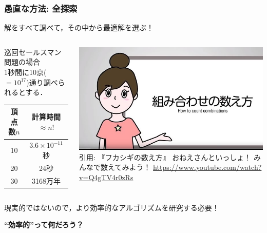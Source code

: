 \documentclass[14pt,aspectratio=169,xcolor=dvipsnames,table,onlytextwidth,dvipdfmx]{beamer}
\begin{document}
\begin{frame}
    \frametitle{愚直な方法: 全探索}
    解をすべて調べて，その中から最適解を選ぶ！
    \pause
    \begin{center}
        \begin{columns}[T]
        \begin{column}{.5\textwidth}
        \centering
        巡回セールスマン問題の場合 \\
        {\scriptsize 1秒間に10京($=10^{17}$)通り調べられるとする．}

        \bigskip
        \begin{tabular}{cc}
            頂点数$n$ & 計算時間$\approx n!$ \\ \hline
            10 & $3.6 \times 10^{-11}$秒 \\
            20 & 24秒 \\
            30 & 3168万年
        \end{tabular}
        \end{column}
        \pause
        \begin{column}{.5\textwidth}
            \centering
            \includegraphics[width=.8\linewidth]{figs/onesan.jpg} \\
            \tiny 引用: 『フカシギの数え方』 おねえさんといっしょ！ みんなで数えてみよう！
            \url{https://www.youtube.com/watch?v=Q4gTV4r0zRs}
        \end{column}
        \end{columns}
    \end{center}
    \pause
    現実的ではないので，より\alert{効率的なアルゴリズム}を研究する必要！
    \begin{center}
    \textbf{“効率的”って何だろう？}
    \end{center}
\end{frame}
\end{document}
